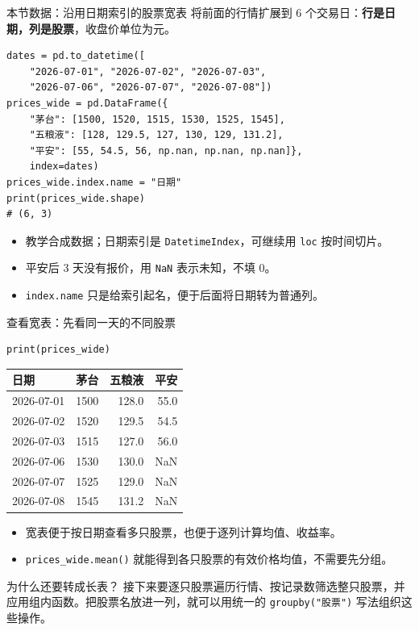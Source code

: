 \documentclass[9pt]{ctexbeamer}
\begin{document}
\begin{frame}[fragile]{本节数据：沿用日期索引的股票宽表}
\small 将前面的行情扩展到 6 个交易日：\textbf{行是日期，列是股票}，收盘价单位为元。
\begin{lstlisting}
dates = pd.to_datetime([
    "2026-07-01", "2026-07-02", "2026-07-03",
    "2026-07-06", "2026-07-07", "2026-07-08"])
prices_wide = pd.DataFrame({
    "茅台": [1500, 1520, 1515, 1530, 1525, 1545],
    "五粮液": [128, 129.5, 127, 130, 129, 131.2],
    "平安": [55, 54.5, 56, np.nan, np.nan, np.nan]},
    index=dates)
prices_wide.index.name = "日期"
print(prices_wide.shape)
# (6, 3)
\end{lstlisting}
\begin{itemize}
\item 教学合成数据；日期索引是 \texttt{DatetimeIndex}，可继续用 \texttt{loc} 按时间切片。
\item 平安后 3 天没有报价，用 \texttt{NaN} 表示未知，不填 0。
\item \texttt{index.name} 只是给索引起名，便于后面将日期转为普通列。
\end{itemize}
\end{frame}

\begin{frame}[fragile]{查看宽表：先看同一天的不同股票}
\begin{lstlisting}
print(prices_wide)
\end{lstlisting}
\begin{center}
\begin{tabular}{lrrr}
\toprule
日期 & 茅台 & 五粮液 & 平安 \\
\midrule
2026-07-01 & 1500 & 128.0 & 55.0 \\
2026-07-02 & 1520 & 129.5 & 54.5 \\
2026-07-03 & 1515 & 127.0 & 56.0 \\
2026-07-06 & 1530 & 130.0 & NaN \\
2026-07-07 & 1525 & 129.0 & NaN \\
2026-07-08 & 1545 & 131.2 & NaN \\
\bottomrule
\end{tabular}
\end{center}
\begin{itemize}
\item 宽表便于按日期查看多只股票，也便于逐列计算均值、收益率。
\item \texttt{prices\_wide.mean()} 就能得到各只股票的有效价格均值，不需要先分组。
\end{itemize}
\begin{block}{为什么还要转成长表？}
接下来要逐只股票遍历行情、按记录数筛选整只股票，并应用组内函数。把股票名放进一列，就可以用统一的 \texttt{groupby("股票")} 写法组织这些操作。
\end{block}
\end{frame}
\end{document}
